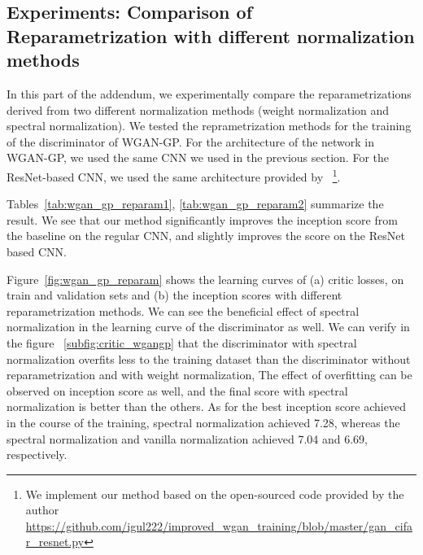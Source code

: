 \documentclass{article}
\begin{document}
\subsection{Experiments: Comparison of Reparametrization with different normalization methods}

In this part of the addendum, we experimentally compare the reparametrizations derived from two different normalization methods (weight normalization and spectral normalization).
We tested the reprametrization methods for the training of the discriminator of WGAN-GP.
For the architecture of the network in WGAN-GP, we used the same CNN we used in the previous section.
For the ResNet-based CNN, we used the same architecture provided by~\cite[]{gulrajani2017improved} \footnote{We implement our method based on the open-sourced code provided by the author~\cite[]{gulrajani2017improved} \url{https://github.com/igul222/improved_wgan_training/blob/master/gan_cifar_resnet.py}}.

Tables~\ref{tab:wgan_gp_reparam1}, \ref{tab:wgan_gp_reparam2} summarize the result.
We see that our method significantly improves the inception score from the baseline on the regular CNN, and slightly improves the score on the ResNet based CNN.

Figure~\ref{fig:wgan_gp_reparam} shows the learning curves of (a) critic losses, on train and validation sets and (b) the inception scores with different reparametrization methods.
We can see the beneficial effect of spectral normalization in the learning curve of the discriminator as well.
We can verify in the figure ~\ref{subfig:critic_wgangp} that
the discriminator with spectral normalization overfits less to the training dataset than the discriminator without reparametrization and with weight normalization,
The effect of overfitting can be observed on inception score as well, and the final score with spectral normalization is better than the others.
As for the best inception score achieved in the course of the training, spectral normalization achieved 7.28, whereas the spectral normalization and vanilla normalization achieved 7.04 and 6.69, respectively.
\end{document}
